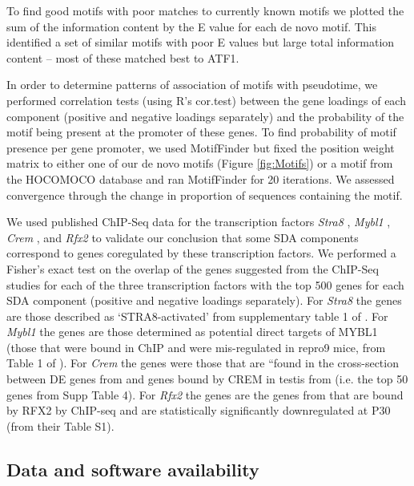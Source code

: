 To find good motifs with poor matches to currently known motifs we plotted the sum of the information content by the E value for each de novo motif. This identified a set of similar motifs with poor E values but large total information content – most of these matched best to ATF1.

In order to determine patterns of association of motifs with pseudotime, we performed correlation tests (using R’s cor.test) between the gene loadings of each component (positive and negative loadings separately) and the probability of the motif being present at the promoter of these genes. To find probability of motif presence per gene promoter, we used MotifFinder but fixed the position weight matrix to either one of our de novo motifs (Figure \ref{fig:Motifs}) or a motif from the HOCOMOCO database and ran MotifFinder for 20 iterations. We assessed convergence through the change in proportion of sequences containing the motif.

We used published ChIP-Seq data for the transcription factors \textit{Stra8} \parencite{Kojima2019Amplification}, \textit{Mybl1} \parencite{Bolcun-Filas2011AMYB}, \textit{Crem} \parencite{Kosir2012Novel}, and \textit{Rfx2} \parencite{Kistler2015RFX2} to validate our conclusion that some SDA components correspond to genes coregulated by these transcription factors. We performed a Fisher’s exact test on the overlap of the genes suggested from the ChIP-Seq studies for each of the three transcription factors with the top 500 genes for each SDA component (positive and negative loadings separately). For \textit{Stra8} the genes are those described as ‘STRA8-activated’ from supplementary table 1 of \cite{Kojima2019Amplification}. For \textit{Mybl1} the genes are those determined as potential direct targets of MYBL1 (those that were bound in ChIP and were mis-regulated in repro9 mice, from Table 1 of \cite{Bolcun-Filas2011AMYB}). For \textit{Crem} the genes were those that are “found in the cross-section between DE genes from \cite{Kosir2012Novel} and genes bound by CREM in testis from \cite{Martianov2005Polar} (i.e. the top 50 genes from \cite{Kosir2012Novel} Supp Table 4). For \textit{Rfx2} the genes are the genes from \cite{Kistler2015RFX2} that are bound by RFX2 by ChIP-seq and are statistically significantly downregulated at P30 (from their Table S1).

\subsection{Data and software availability}

